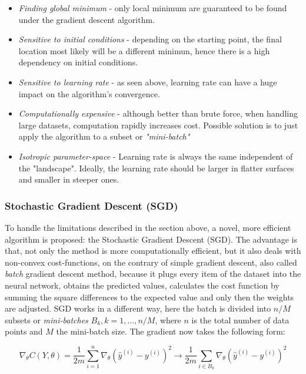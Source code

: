 \begin{itemize}
	\item \textit{Finding global minimum} - only local minimum are guaranteed to be found under the gradient descent algorithm.
	\item \textit{Sensitive to initial conditions} - depending on the starting point, the final location most likely will be a different minimun, hence there is a high dependency on initial conditions.
	\item \textit{Sensitive to learning rate} - as seen above, learning rate can have a huge impact on the algorithm's convergence.
	\item \textit{Computationally expensive} - although better than brute force, when handling large datasets, computation rapidly increases cost. Possible solution is to just apply the algorithm to a subset or \textit{"mini-batch"}
	\item \textit{Isotropic parameter-space} - Learning rate is always the same independent of the "landscape". Ideally, the learning rate should be larger in flatter surfaces and smaller in steeper ones. \cite{ml_phys} 
\end{itemize}
 

\subsubsection{Stochastic Gradient Descent (SGD)}

To handle the limitations described in the section above, a novel, more efficient algorithm is proposed: the Stochastic Gradient Descent (SGD). The advantage is that, not only the method is more computationally efficient, but it also deals with non-convex cost-functions, on the contrary of simple gradient descent, also called \textit{batch} gradient descent method, because it plugs every item of the dataset into the neural network, obtains the predicted values, calculates the cost function by summing the square differences to the expected value and only then the weights are adjusted. \cite{nielsenneural}
SGD works in a different way, here the batch is divided into $n/M$ subsets or \textit{mini-batches} $B_k, k={1,...,n/M}$, where $n$ is the total number of data points and $M$ the mini-batch size. The gradient now takes the following form: 

\begin{equation}
\nabla_{\theta} C(Y,\theta) = \frac{1}{2m}\sum_{i=1}^{n}\nabla_{\theta} (\hat{y}^{(i)} - y^{(i)})^2 \rightarrow \frac{1}{2m}\sum_{i \in B_k}\nabla_{\theta} (\hat{y}^{(i)} - y^{(i)})^2
\end{equation}


